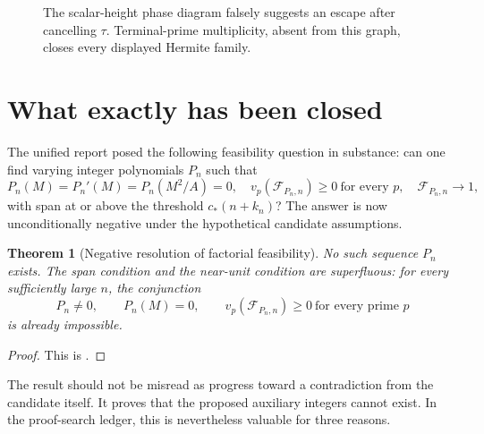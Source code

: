 \documentclass[11pt,oneside]{article}
\newtheorem{theorem}{Theorem}[section]
\theoremstyle{definition}
\theoremstyle{remark}
\newcommand{\vp}[2]{v_{#1}\!\left(#2\right)}
\newcommand{\cstar}{c_{\!*}}
\newcommand{\FF}{\mathcal F}
\begin{document}
\begin{figure}[ht]
\centering
{}
\caption{The scalar-height phase diagram falsely suggests an escape after cancelling
$\tau$.  Terminal-prime multiplicity, absent from this graph, closes every displayed
Hermite family.}
\label{fig:phase}
\end{figure}

\section{What exactly has been closed}
\label{sec:closed}

The unified report posed the following feasibility question in substance: can one find
varying integer polynomials $P_n$ such that
\[
 P_n(M)=P_n'(M)=P_n(M^2/A)=0,
 \quad
 \vp p{\FF_{P_n,n}}\ge0\ \text{for every }p,
 \quad
 \FF_{P_n,n}\to1,
\]
with span at or above the threshold $\cstar(n+k_n)$?  The answer is now unconditionally
negative under the hypothetical candidate assumptions.

\begin{theorem}[Negative resolution of factorial feasibility]
\label{thm:target-closed}
No such sequence $P_n$ exists.  The span condition and the near-unit condition are
superfluous: for every sufficiently large $n$, the conjunction
\[
 P_n\ne0,\qquad P_n(M)=0,
 \qquad \vp p{\FF_{P_n,n}}\ge0\ \text{for every prime }p
\]
is already impossible.
\end{theorem}

\begin{proof}
This is .
\end{proof}

The result should not be misread as progress toward a contradiction from the candidate
itself.  It proves that the proposed auxiliary integers cannot exist.  In the proof-search
ledger, this is nevertheless valuable for three reasons.
\end{document}
